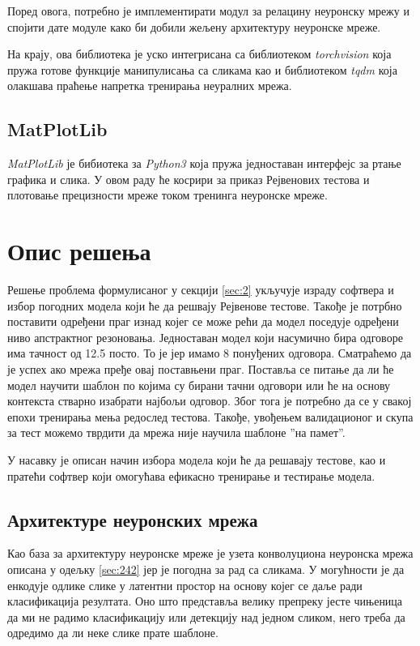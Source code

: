 \documentclass[a4paper, 12pt, master, utf8]{etf}
\begin{document}
Поред овога, потребно је имплементирати модул за релацину неуронску мрежу и спојити дате модуле како би добили жељену архитектуру неуронске мреже.
\newline

На крају, ова библиотека је уско интегрисана са библиотеком \textit{torchvision} која пружа готове функције манипулисања са сликама као и библиотеком \textit{tqdm} 
која олакшава праћење напретка тренирања неуралних мрежа.

\section{MatPlotLib}
\label{sec:33}
\textit{MatPlotLib} је бибиотека за \textit{Python3} која пружа једноставан интерфејс за ртање графика и слика. У овом раду 
ће косрири за приказ Рејвенових тестова и плотовање прецизности мреже током тренинга неуронске мреже.


\chapter{Опис решења}
\label{sec:4}

Решење проблема формулисаног у секцији \ref{sec:2} укључује израду софтвера и избор погодних модела који ће да решвају Рејвенове тестове.
Такође је потрбно поставити одређени праг изнад којег се може рећи да модел поседује одређени ниво апстрактног резоновања. Једноставан модел који насумично бира одговоре 
има тачност од 12.5 посто. То је јер имамо 8 понуђених одговора. Сматраћемо да је успех ако мрежа пређе овај поставњени праг. Поставља се питање да ли ће модел научити шаблон по 
којима су бирани тачни одговори или ће на основу контекста стварно изабрати најбољи одговор. Због тога је потребно да се у свакој епохи тренирања мења редослед тестова. Такође, увођењем 
валидационог и скупа за тест можемо тврдити да мрежа није научила шаблоне ”на памет”. 

У насавку је описан начин избора модела који ће да решавају тестове, као и пратећи софтвер који омогућава ефикасно тренирање и тестирање модела.

\section{Архитектуре неуронских мрежа}
\label{sec:41}
Као база за архитектуру неуронске мреже је узета конволуциона неуронска мрежа описана у одељку \ref{sec:242} јер је погодна за рад са сликама. У могућности је да енкодује одлике слике 
у латентни простор на основу којег се даље ради класификација резултата. Оно што представља велику препреку јесте чињеница да ми не радимо класификацију или детекцију над једном сликом, него 
треба да одредимо да ли неке слике прате шаблоне. 
\newline
\end{document}
